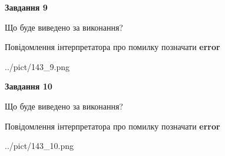 \documentclass[12pt, ukrainian]{article}
\begin{document}
{{\begin {center}\textbf{Завдання 9}\end {center}}\par
Що буде виведено за виконання? \par
Повідомлення інтерпретатора про помилку позначати \textbf{error}

\begin{center}
	{../pict/143_9.png}
\end{center}
\newpage

{\begin {center}\textbf{Завдання 10}\end {center}}\par
Що буде виведено за виконання? \par
Повідомлення інтерпретатора про помилку позначати \textbf{error}

\begin{center}
	{../pict/143_10.png}
\end{center}
\newpage

}
\end{document}
